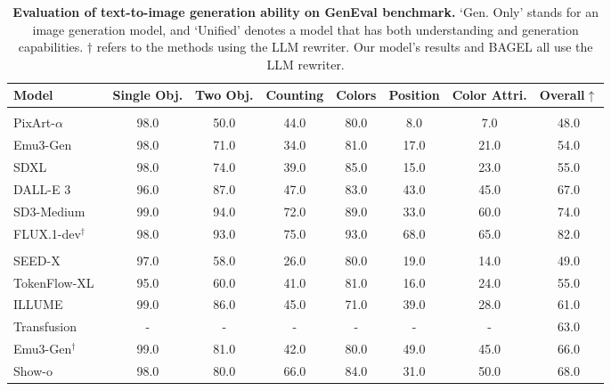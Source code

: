 
\begin{table}[ht]
    \centering
    \scriptsize
    \caption{\textbf{Evaluation of text-to-image generation ability on GenEval benchmark.} 
        `Gen. Only' stands for an image generation model, and `Unified' denotes a model that has both understanding and generation capabilities. 
        $\dagger$ refers to the methods using the LLM rewriter. Our model's results and BAGEL all use the LLM rewriter.}
    \begin{tabular}{lccccccc}
        \toprule
        \textbf{Model}  & \textbf{Single Obj.} & \textbf{Two Obj.} & \textbf{Counting} & \textbf{Colors} & \textbf{Position} & \textbf{Color Attri.} & \textbf{Overall$\uparrow$} \\
        \midrule
        \rowcolor{gray!10}
        \multicolumn{8}{l}{\textit{Gen. Only Models}} \\
        PixArt-$\alpha$~\cite{chen2024pixart} & 98.0 & 50.0 & 44.0 & 80.0 & 8.0 & 7.0 & 48.0 \\
        Emu3-Gen~\cite{emu3}  & 98.0 & 71.0 & 34.0 & 81.0 & 17.0 & 21.0 & 54.0 \\
        SDXL~\cite{sdxl} & 98.0 & 74.0 & 39.0 & 85.0 & 15.0 & 23.0 & 55.0 \\
        DALL-E $3$~\cite{dalle3} & 96.0 & 87.0 & 47.0 & 83.0 & 43.0 & 45.0 & 67.0 \\
        SD3-Medium~\cite{sd3} & 99.0 & 94.0 & 72.0 & 89.0 & 33.0 & 60.0 & 74.0 \\
        FLUX.1-dev$^{\dagger}$~\cite{flux} & 98.0 & 93.0 & 75.0 & 93.0 & 68.0 & 65.0 & 82.0 \\
        \midrule
        \rowcolor{gray10}
        \multicolumn{8}{l}{\textit{Unified Models}} \\
        SEED-X~\cite{seedx} & 97.0 & 58.0 & 26.0 & 80.0 & 19.0 & 14.0 & 49.0 \\
        TokenFlow-XL~\cite{tokenflow} & 95.0 & 60.0 & 41.0 & 81.0 & 16.0 & 24.0 & 55.0 \\
        ILLUME~\cite{illume} & 99.0 & 86.0 & 45.0 & 71.0 & 39.0 & 28.0 & 61.0 \\
        Transfusion~\cite{transfusion} & - & - & - & - & - & - & 63.0 \\
        Emu$3$-Gen$^{\dagger}$\cite{emu3} & 99.0 & 81.0 & 42.0 & 80.0 & 49.0 & 45.0 & 66.0 \\
        Show-o~\cite{showo} & 98.0 & 80.0 & 66.0 & 84.0 & 31.0 & 50.0 & 68.0 \\

\end{tabular}
\end{table}
